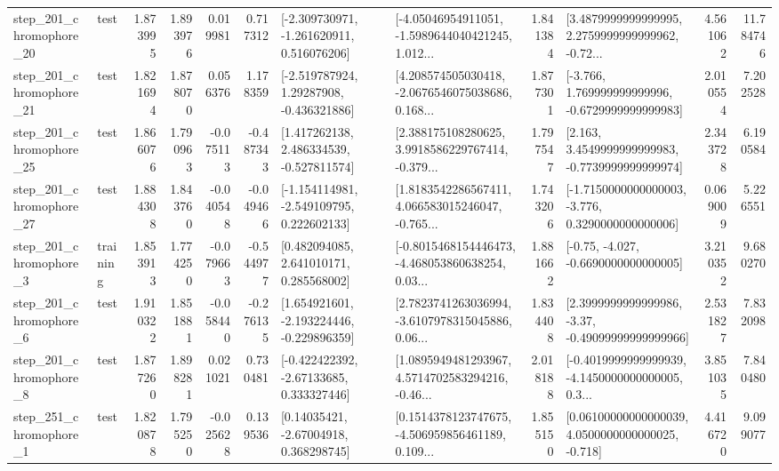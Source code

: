 \begin{tabular}{llrrrrllrlrr}
  step\_201\_chromophore\_20 &      test &      1.873995 &    1.893976 &      0.019981 &  0.717312 &   [-2.309730971, -1.261620911, 0.516076206] &  [-4.05046954911051, -1.5989644040421245, 1.012... &       1.841384 &  [3.4879999999999995, 2.2759999999999962, -0.72... &            4.561062 &         11.784746 \\
  step\_201\_chromophore\_21 &      test &      1.821694 &    1.878070 &      0.056376 &  1.178359 &    [-2.519787924, 1.29287908, -0.436321886] &  [4.208574505030418, -2.0676546075038686, 0.168... &       1.877301 &   [-3.766, 1.769999999999996, -0.6729999999999983] &            2.010554 &          7.202528 \\
  step\_201\_chromophore\_25 &      test &      1.866076 &    1.790963 &     -0.075113 & -0.487343 &    [1.417262138, 2.486334539, -0.527811574] &  [2.388175108280625, 3.9918586229767414, -0.379... &       1.797547 &   [2.163, 3.4549999999999983, -0.7739999999999974] &            2.343728 &          6.190584 \\
  step\_201\_chromophore\_27 &      test &      1.884308 &    1.843760 &     -0.040548 & -0.049466 &   [-1.154114981, -2.549109795, 0.222602133] &  [1.8183542286567411, 4.066583015246047, -0.765... &       1.743206 &  [-1.7150000000000003, -3.776, 0.3290000000000006] &            0.069009 &          5.226551 \\
   step\_201\_chromophore\_3 &  training &      1.853913 &    1.774250 &     -0.079663 & -0.544977 &     [0.482094085, 2.641010171, 0.285568002] &  [-0.8015468154446473, -4.468053860638254, 0.03... &       1.881662 &               [-0.75, -4.027, -0.6690000000000005] &            3.210352 &          9.680270 \\
   step\_201\_chromophore\_6 &      test &      1.910322 &    1.851881 &     -0.058440 & -0.276135 &   [1.654921601, -2.193224446, -0.229896359] &  [2.7823741263036994, -3.6107978315045886, 0.06... &       1.834408 &  [2.3999999999999986, -3.37, -0.49099999999999966] &            2.531827 &          7.832098 \\
   step\_201\_chromophore\_8 &      test &      1.877260 &    1.898281 &      0.021021 &  0.730481 &    [-0.422422392, -2.67133685, 0.333327446] &  [1.0895949481293967, 4.5714702583294216, -0.46... &       2.018188 &  [-0.4019999999999939, -4.1450000000000005, 0.3... &            3.851035 &          7.840480 \\
   step\_251\_chromophore\_1 &      test &      1.820878 &    1.795250 &     -0.025628 &  0.139536 &      [0.14035421, -2.67004918, 0.368298745] &  [0.1514378123747675, -4.506959856461189, 0.109... &       1.855150 &  [0.06100000000000039, 4.0500000000000025, -0.718] &            4.416720 &          9.099077 \\

\end{tabular}
